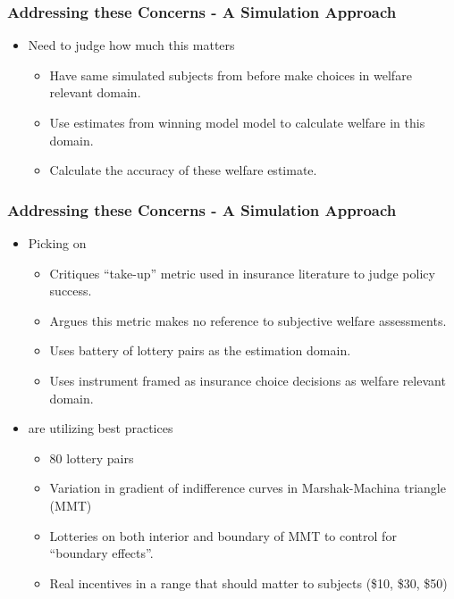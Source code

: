 \documentclass{beamer}
\begin{document}
\begin{frame}
\frametitle{Addressing these Concerns - A Simulation Approach}
\begin{itemize}
	\item Need to judge how much this matters
		\begin{itemize}
			\item Have same simulated subjects from before make choices in welfare relevant domain.
			\item Use estimates from winning model model to calculate welfare in this domain.
			\item Calculate the accuracy of these welfare estimate.
		\end{itemize}
\end{itemize}
\end{frame}

\begin{frame}
	\frametitle{Addressing these Concerns - A Simulation Approach}
\begin{itemize}
	\item Picking on \textcite{Harrison2016}
		\begin{itemize}
			\item Critiques \enquote{take-up} metric used in insurance literature to judge policy success.
			\item Argues this metric makes no reference to subjective welfare assessments.
			\item Uses battery of lottery pairs as the estimation domain.
			\item Uses instrument framed as insurance choice decisions as welfare relevant domain.
		\end{itemize}
	\item \textcite{Harrison2016} are utilizing best practices
		\begin{itemize}
			\item 80 lottery pairs
			\item Variation in gradient of indifference curves in Marshak-Machina triangle (MMT)
			\item Lotteries on both interior and boundary of MMT to control for \enquote{boundary effects}.
			\item Real incentives in a range that should matter to subjects (\$10, \$30, \$50)
		\end{itemize}
\end{itemize}
\end{frame}
\end{document}
